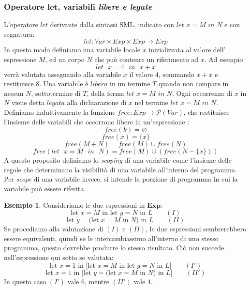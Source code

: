 \documentclass{article}
\theoremstyle{definition}
\theoremstyle{definition}
\theoremstyle{definition}
\newtheorem{example}[theorem]{Esempio}
\theoremstyle{remark}
\begin{document}
    \subsubsection{Operatore $\boldsymbol{let}$, variabili \textit{libere e legate}}
    L'operatore $let$ derivante dalla sintassi SML, indicato con $let$ $x=M$ $in$ $N$ e con segnatura:
    $$let : Var \times Exp\times Exp\to Exp$$
    In questo modo definiamo una variabile locale $x$ inizializzata al valore dell' espressione $M$, ed un corpo $N$ che può contenre un riferimento ad $x$. Ad esempio
    $$\text{$let$ $x=4$ $in$ $x+x$}$$
    verrà valutata assegnando alla variabile $x$ il valore $4$, sommando $x+x$ e restituisce $8$.
    Una variabile  è $libera$ in un termine $T$ quando non compare in nessun $N$, sottotermine di $T$, della forma $let$ $x=M$ $in$ $N$.
    Ogni occorrenza di $x$ in $N$ viene detta $legata$ alla dichiarazione di $x$ nel termine $let$ $x=M$ $in$ $N$.
    Definiamo induttivamente la funzione $free:Exp\to \mathcal{P}(Var)$, che restituisce l'insieme delle variabili  che occorrono libere in un'espressione :
    $$free(k) = \varnothing$$
    $$free(x) = \{x\}$$
    $$free(M+N) = free(M)\cup free(N)$$
    $$free(\text{$let$ $x=M$ $in$ $N$}) = free(M) \cup (free(N-\{x\}))$$
    A questo proposito definiamo lo \textit{scoping} di una variabile come l'insieme delle regole che determinano la
    visibilità di una variabile all'interno del programma. Per \textit{scope} di una variabile invece, si intende la porzione di programma in cui la
    variabile può essere riferita.
    \begin{example}
        Consideriamo le due espressioni in $\boldsymbol{Exp}$:
        $$\text{let $x=M$ in let $y=N$ in $L$}  \qquad(I)$$
        $$\text{let $y=$(let $x=M$ in $N$) in $L$}\qquad (II)$$
        Se procediamo alla valutazione di $(I)$ e $(II)$, le due espressioni
        sembrerebbero essere equivalenti, quindi se le intercambiassimo all'interno
        di uno stesso programma, questo dovrebbe produrre lo stesso risultato. Ciò non
        succede nell'espressione qui sotto se valutata:
        $$\text{let $x=1$ in [let $x=M$ in let $y=N$ in $L$]}  \qquad(I')$$
        $$\text{let $x=1$ in [let $y=$(let $x=M$ in $N$) in $L$]}\qquad (II')$$
        In questo caso $(I')$ vale $6$, mentre $(II')$ vale $4$.

    \end{example}
\end{document}
